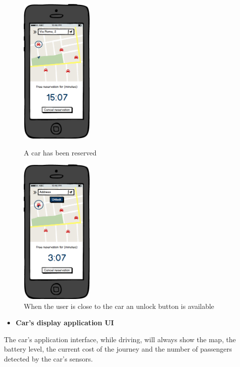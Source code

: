 \documentclass[english]{article}
\begin{document}
\begin{figure}[H]
	\centering
	\begin{minipage}{.55\textwidth}
	\centering
	\includegraphics[width=100pt]{mobile/FreeReservation.png}
	\caption{A car has been reserved}
	\end{minipage}%
	\begin{minipage}{.5\textwidth}
	\centering
	\includegraphics[width=100pt]{mobile/Unlock.png}
	\caption{When the user is close to the car an unlock button is available}
	\end{minipage}
\end{figure}


\newpage
\begin{itemize}
	\item{\textbf{Car's display application UI}}
\end{itemize}

The car's application interface, while driving, will always show the map, the battery level, the current cost of the journey and the number of passengers detected by the car's sensors. 
\end{document}
